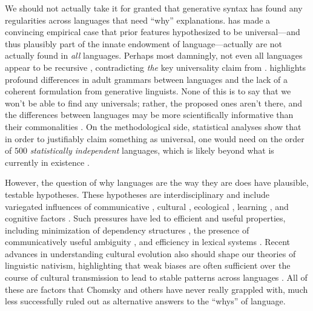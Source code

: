 \documentclass[output=paper,colorlinks,citecolor=brown
]{langscibook}
\begin{document}
We should not actually take it for granted that generative syntax has found any regularities across languages that need ``why'' explanations. \cite{evans2009myth} has made a convincing empirical case that prior features hypothesized to be universal---and thus plausibly part of the innate endowment of language---actually are not actually found in \emph{all} languages. Perhaps most damningly, not even all languages appear to be recursive \citep{everett2005cultural,futrell2016corpus,pullum2023dan}, contradicting \emph{the} key universality claim from \cite{hauser2002faculty}. \cite{dkabrowska2015exactly} highlights profound differences in adult grammars between languages and the lack of a coherent formulation from generative linguists.  None of this is to say that we won't be able to find any universals; rather, the proposed ones aren't there, and the differences between languages may be more scientifically informative than their commonalities \citep{pullum2009universals}. On the methodological side, statistical analyses show that in order to justifiably claim something as universal, one would need on the order of $500$ \emph{statistically independent} languages, which is likely beyond what is currently in existence \citep{piantadosi2014quantitative}. 

However, the question of why languages are the way they are does have plausible, testable hypotheses. These hypotheses are interdisciplinary \citep{reali2009necessity} and include variegated influences of communicative \citep{zipf1965psycho,hockett1959animal,bates1982functionalist,piantadosi2012communicative,gibson2013rational,gibson2019efficiency,coupe2019different,hahn2020universals,futrell2022information}, cultural \citep{everett2005cultural,lupyan2010language,dale2012understanding,everett2015climate}, ecological \citep{lupyan2016there}, learning \citep{smith2012compositionality,steinert2019learnability,steinert2020ease}, and cognitive factors \citep{gibson2000dependency,futrell2015large}. Such pressures have led to efficient and useful properties, including minimization of dependency structures \citep{futrell2015large}, the presence of communicatively useful ambiguity \citep{piantadosi2012communicative}, and efficiency in lexical systems \citep{kemp2012kinship,kemp2018semantic,zaslavsky2019semantic,steinert2020quantifiers,mollica2021forms,mahowald2022efficient,denic2022indefinite}. Recent advances in understanding cultural evolution also should shape our theories of linguistic nativism, highlighting that weak biases are often sufficient over the course of cultural transmission to lead to stable patterns across languages \citep{thompson2016culture,kirby2014iterated,chater2009restrictions}. All of these are factors that Chomsky and others have never really grappled with, much less successfully ruled out as alternative answers to the ``whys'' of language.  
\end{document}
